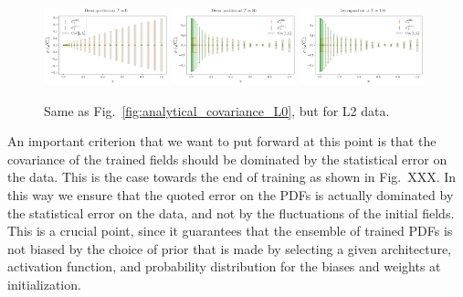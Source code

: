 \begin{figure}[ht!]
  \centering
  \includegraphics[width=0.32\textwidth]{plots/analytical_solution/xT3/covariance/diagonal/decomposition/L2/linear/diag_error_decomposition_epoch_0_L2_linear.pdf}
  \includegraphics[width=0.32\textwidth]{plots/analytical_solution/xT3/covariance/diagonal/decomposition/L2/linear/diag_error_decomposition_epoch_50_L2_linear.pdf}
  \includegraphics[width=0.32\textwidth]{plots/analytical_solution/xT3/covariance/diagonal/decomposition/L2/linear/diag_error_decomposition_epoch_100_L2_linear.pdf}
  \caption{Same as Fig.~\ref{fig:analytical_covariance_L0}, but for L2 data.}
  \label{fig:analytical_covariance_L2}
\end{figure}


An important criterion that we want to put forward at this point is that the covariance of the trained
fields should be dominated by the statistical error on the data. This is the case towards the end of
training as shown in Fig.~XXX. In this way we ensure that the quoted error 
on the PDFs is actually dominated by the statistical error on the data, and not by the fluctuations of the
initial fields. This is a crucial point, since it guarantees that the ensemble of trained PDFs is not biased by the
choice of prior that is made by selecting a given architecture, activation function, and probability distribution 
for the biases and weights at initialization. 

\FloatBarrier

